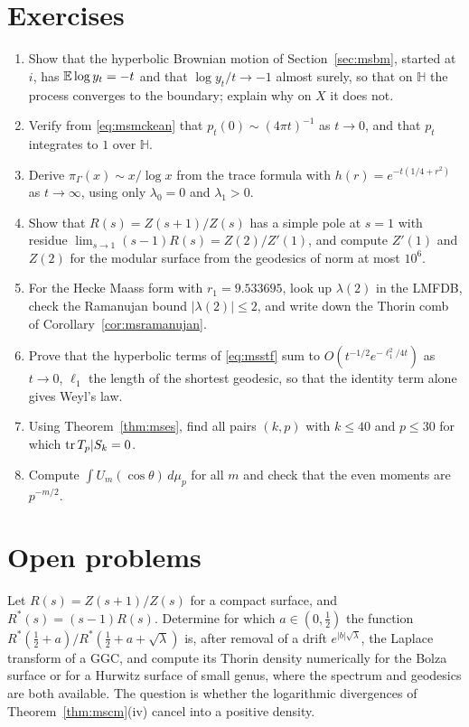 \section{Exercises}

\begin{enumerate}
\item Show that the hyperbolic Brownian motion of Section~\ref{sec:msbm}, started at $i$, has $\mathbb{E}\log y_t=-t$ and that $\log y_t/t\to-1$ almost surely, so that on $\mathbb H$ the process converges to the boundary; explain why on $X$ it does not.
\item Verify from \eqref{eq:msmckean} that $p_t(0)\sim(4\pi t)^{-1}$ as $t\to0$, and that $p_t$ integrates to $1$ over $\mathbb H$.
\item Derive $\pi_\Gamma(x)\sim x/\log x$ from the trace formula with $h(r)=e^{-t(1/4+r^2)}$ as $t\to\infty$, using only $\lambda_0=0$ and $\lambda_1>0$.
\item Show that $R(s)=Z(s+1)/Z(s)$ has a simple pole at $s=1$ with residue $\lim_{s\to1}(s-1)R(s)=Z(2)/Z'(1)$, and compute $Z'(1)$ and $Z(2)$ for the modular surface from the geodesics of norm at most $10^6$.
\item For the Hecke Maass form with $r_1=9.533695$, look up $\lambda(2)$ in the LMFDB, check the Ramanujan bound $|\lambda(2)|\le2$, and write down the Thorin comb of Corollary~\ref{cor:msramanujan}.
\item Prove that the hyperbolic terms of \eqref{eq:msstf} sum to $O(t^{-1/2}e^{-\ell_1^2/4t})$ as $t\to0$, $\ell_1$ the length of the shortest geodesic, so that the identity term alone gives Weyl's law.
\item Using Theorem~\ref{thm:mses}, find all pairs $(k,p)$ with $k\le40$ and $p\le30$ for which $\operatorname{tr} T_p|S_k=0$.
\item Compute $\int U_m(\cos\theta)\,d\mu_p$ for all $m$ and check that the even moments are $p^{-m/2}$.
\end{enumerate}

\section{Open problems}

\begin{problem}\label{op:mscentre}
Let $R(s)=Z(s+1)/Z(s)$ for a compact surface, and $R^*(s)=(s-1)R(s)$. Determine for which $a\in(0,\frac12)$ the function $R^*(\frac12+a)/R^*(\frac12+a+\sqrt\lambda)$ is, after removal of a drift $e^{|b|\sqrt\lambda}$, the Laplace transform of a GGC, and compute its Thorin density numerically for the Bolza surface or for a Hurwitz surface of small genus, where the spectrum and geodesics are both available. The question is whether the logarithmic divergences of Theorem~\ref{thm:mscm}(iv) cancel into a positive density.
\end{problem}

